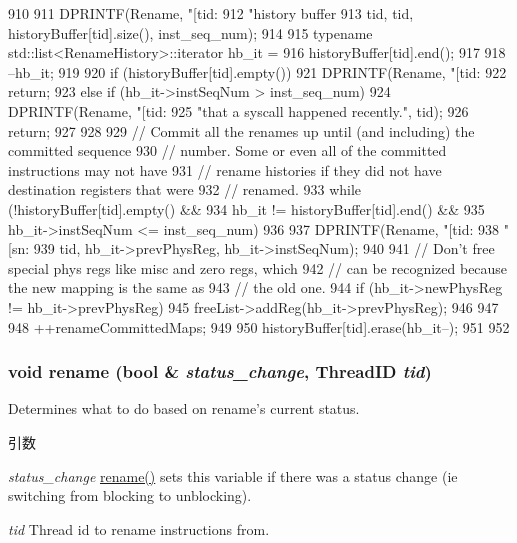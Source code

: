 \begin{DoxyCode}
910 {
911     DPRINTF(Rename, "[tid:%
912             "history buffer %
913             tid, tid, historyBuffer[tid].size(), inst_seq_num);
914 
915     typename std::list<RenameHistory>::iterator hb_it =
916         historyBuffer[tid].end();
917 
918     --hb_it;
919 
920     if (historyBuffer[tid].empty()) {
921         DPRINTF(Rename, "[tid:%
922         return;
923     } else if (hb_it->instSeqNum > inst_seq_num) {
924         DPRINTF(Rename, "[tid:%
925                 "that a syscall happened recently.\n", tid);
926         return;
927     }
928 
929     // Commit all the renames up until (and including) the committed sequence
930     // number. Some or even all of the committed instructions may not have
931     // rename histories if they did not have destination registers that were
932     // renamed.
933     while (!historyBuffer[tid].empty() &&
934            hb_it != historyBuffer[tid].end() &&
935            hb_it->instSeqNum <= inst_seq_num) {
936 
937         DPRINTF(Rename, "[tid:%
938                 "[sn:%
939                 tid, hb_it->prevPhysReg, hb_it->instSeqNum);
940 
941         // Don't free special phys regs like misc and zero regs, which
942         // can be recognized because the new mapping is the same as
943         // the old one.
944         if (hb_it->newPhysReg != hb_it->prevPhysReg) {
945             freeList->addReg(hb_it->prevPhysReg);
946         }
947 
948         ++renameCommittedMaps;
949 
950         historyBuffer[tid].erase(hb_it--);
951     }
952 }
\end{DoxyCode}
\hypertarget{classDefaultRename_ae79f7fcdd0255495d6df18c063988432}{
\subsubsection[{rename}]{\setlength{\rightskip}{0pt plus 5cm}void rename (bool \& {\em status\_\-change}, \/  {\bf ThreadID} {\em tid})}}
\label{classDefaultRename_ae79f7fcdd0255495d6df18c063988432}
Determines what to do based on rename's current status. 
\begin{DoxyParams}{引数}
\item[{\em status\_\-change}]\hyperlink{classDefaultRename_ae79f7fcdd0255495d6df18c063988432}{rename()} sets this variable if there was a status change (ie switching from blocking to unblocking). \item[{\em tid}]Thread id to rename instructions from. \end{DoxyParams}



